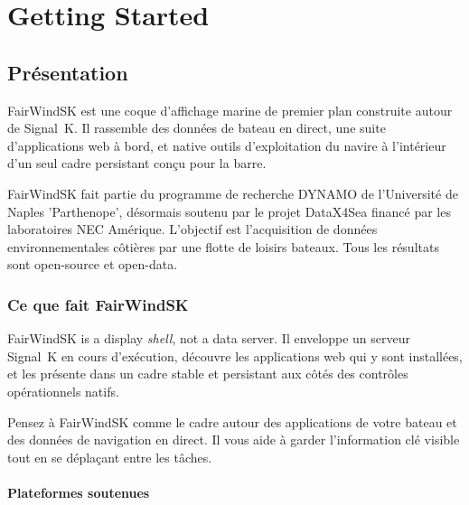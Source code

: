 \part{Getting Started}

\chapter{Présentation}

FairWindSK est une coque d'affichage marine de premier plan construite autour de Signal~K.
Il rassemble des données de bateau en direct, une suite d'applications web à bord, et native
outils d'exploitation du navire à l'intérieur d'un seul cadre persistant conçu pour la barre.

\begin{notebox}
FairWindSK fait partie du programme de recherche DYNAMO de l'Université de Naples
'Parthenope', désormais soutenu par le projet DataX4Sea financé par les laboratoires NEC
Amérique.
L'objectif est l'acquisition de données environnementales côtières par une flotte de loisirs
bateaux.
Tous les résultats sont open-source et open-data.
\end{notebox}

\section{Ce que fait FairWindSK}

FairWindSK is a display \emph{shell}, not a data server.
Il enveloppe un serveur Signal~K en cours d'exécution, découvre les applications web qui y sont installées,
et les présente dans un cadre stable et persistant aux côtés des contrôles opérationnels natifs.

Pensez à FairWindSK comme le cadre autour des applications de votre bateau et des données de navigation en direct.
Il vous aide à garder l'information clé visible tout en se déplaçant entre les tâches.

\subsection{Plateformes soutenues}

